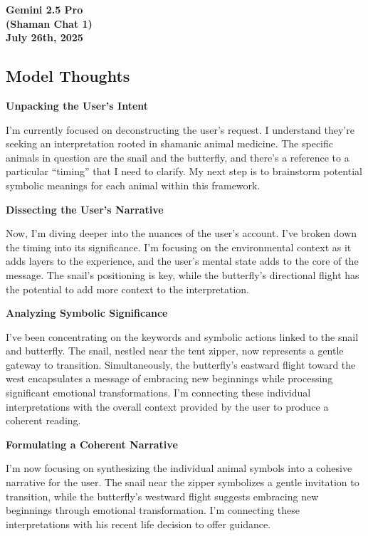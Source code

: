 \documentclass{article}
\begin{document}
\begin{center}
\textbf{Gemini 2.5 Pro} \\
\textbf{(Shaman Chat 1)} \\
\textbf{July 26th, 2025}
\end{center}

\medskip

\subsection*{Model Thoughts}\label{model-thoughts}

\textbf{Unpacking the User's Intent}

I'm currently focused on deconstructing the user's request. I understand
they're seeking an interpretation rooted in shamanic animal medicine.
The specific animals in question are the snail and the butterfly, and
there's a reference to a particular ``timing'' that I need to clarify.
My next step is to brainstorm potential symbolic meanings for each
animal within this framework.

\textbf{Dissecting the User's Narrative}

Now, I'm diving deeper into the nuances of the user's account. I've
broken down the timing into its significance. I'm focusing on the
environmental context as it adds layers to the experience, and the
user's mental state adds to the core of the message. The snail's
positioning is key, while the butterfly's directional flight has the
potential to add more context to the interpretation.

\textbf{Analyzing Symbolic Significance}

I've been concentrating on the keywords and symbolic actions linked to
the snail and butterfly. The snail, nestled near the tent zipper, now
represents a gentle gateway to transition. Simultaneously, the
butterfly's eastward flight toward the west encapsulates a message of
embracing new beginnings while processing significant emotional
transformations. I'm connecting these individual interpretations with
the overall context provided by the user to produce a coherent reading.

\textbf{Formulating a Coherent Narrative}

I'm now focusing on synthesizing the individual animal symbols into a
cohesive narrative for the user. The snail near the zipper symbolizes a
gentle invitation to transition, while the butterfly's westward flight
suggests embracing new beginnings through emotional transformation. I'm
connecting these interpretations with his recent life decision to offer
guidance.
\end{document}
